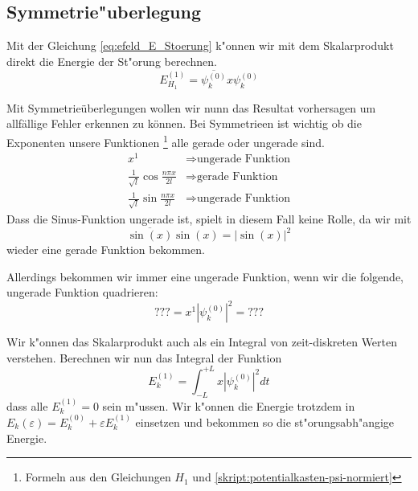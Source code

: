 \begin{refsection}
\subsection{Symmetrie"uberlegung}
Mit der Gleichung \ref{eq:efeld_E_Stoerung} k"onnen wir mit dem Skalarprodukt direkt die Energie der St"orung berechnen.
\begin{equation}
  \label{eq:efeld_E_Stoerung}
  E_{H_1}^{(1)} = \overline{\psi_k^{(0)}} x \psi_k^{(0)}
\end{equation}

Mit Symmetrie\"uberlegungen wollen wir nunn das Resultat vorhersagen um allf\"allige Fehler erkennen zu k\"onnen.
Bei Symmetrieen ist wichtig ob die Exponenten unsere Funktionen
\footnote{Formeln aus den Gleichungen $H_1$ und \ref{skript:potentialkasten-psi-normiert}}
alle gerade oder ungerade sind.
\begin{equation}
\begin{aligned}
x^1 &\Rightarrow \text{ungerade Funktion}
\\
\frac{1}{\sqrt{l}}\cos\frac{n \pi x}{2l} &\Rightarrow \text{gerade Funktion}
\\
\frac{1}{\sqrt{l}}\sin\frac{n \pi x}{2l} &\Rightarrow \text{ungerade Funktion}
\end{aligned}
\end{equation}
Dass die Sinus-Funktion ungerade ist, spielt in diesem Fall keine Rolle, da wir mit 
\[
  \overline{\sin(x)} \sin(x) = |\sin(x)|^2
\]
wieder eine gerade Funktion bekommen.

Allerdings bekommen wir immer eine ungerade Funktion, wenn wir die folgende, ungerade Funktion quadrieren:
\[ 
  ??? = x^1 |\psi_k^{(0)}|^2 = ???
\]

Wir k"onnen das Skalarprodukt auch als ein Integral von zeit-diskreten Werten verstehen.
Berechnen wir nun das Integral der Funktion %
\[
  E_k^{(1)} = \int_{-L}^{+L} x |\psi_k^{(0)}|^2 dt
\]
dass alle $E_k^{(1)} = 0$ sein m"ussen.
Wir k"onnen die Energie trotzdem in
$E_k(\varepsilon)=E_k^{(0)} + \varepsilon E_k^{(1)}$ einsetzen
und bekommen so die st"orungsabh"angige Energie.

\end{refsection}
